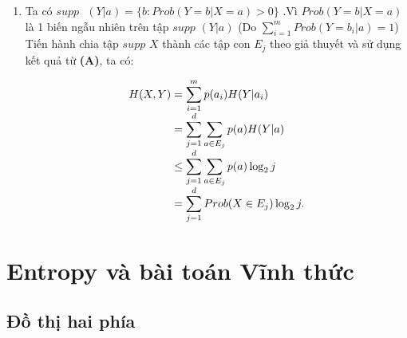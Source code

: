 \documentclass[a4paper, 12pt]{report}
\begin{document}
\begin{enumerate}[label=(\Alph*)]
\item Ta có $supp\textrm{ }(Y|a) = \{b: Prob(Y=b|X=a) > 0 \}$ .Vì $Prob(Y=b|X=a)$ là 1 biến ngẫu nhiên trên tập $supp$ $(Y|a)$ (Do $\displaystyle \sum_{i=1}^{m}Prob(Y=b_{i}|a) =1$) Tiến hành chia tập $supp$ $X$ thành các tập con $E_{j}$ theo giả thuyết và sử dụng kết quả từ \textbf{(A)}, ta có:

\begin{equation*}
\begin{array}{l@{}l}
H(X,Y)
	&{} = \displaystyle \sum_{i=1}^{m}p(a_{i})H(Y|a_{i}) \\
	&{}= \displaystyle \sum _{j=1}^{d}\sum_{a \in E_{j}}p(a)H(Y|a) \\
	&{} \leq \displaystyle \sum _{j=1}^{d}\sum_{a \in E_{j}}p(a)\log_{2}j \\
	&{} = \displaystyle \sum_{j=1}^{d}Prob(X \in E_{j})\log_{2}j.
\end{array}
\end{equation*}
\end{enumerate}




\chapter{Entropy và bài toán Vĩnh thức}


\section{Đồ thị hai phía}
\end{document}
